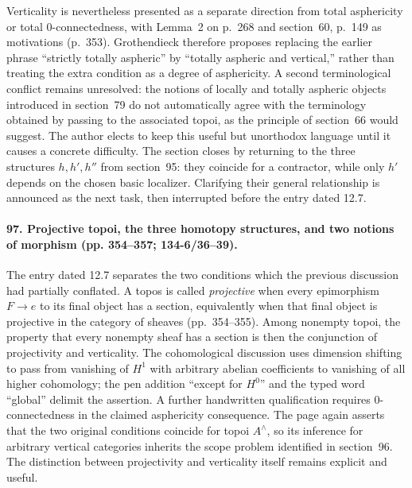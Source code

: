 Verticality is nevertheless presented as a separate direction from total asphericity or total 0-connectedness, with Lemma~2 on p.~268 and section~60, p.~149 as motivations (p.~353). Grothendieck therefore proposes replacing the earlier phrase ``strictly totally aspheric'' by ``totally aspheric and vertical,'' rather than treating the extra condition as a degree of asphericity. A second terminological conflict remains unresolved: the notions of locally and totally aspheric objects introduced in section~79 do not automatically agree with the terminology obtained by passing to the associated topoi, as the principle of section~66 would suggest. The author elects to keep this useful but unorthodox language until it causes a concrete difficulty. The section closes by returning to the three structures $h,h',h''$ from section~95: they coincide for a contractor, while only $h'$ depends on the chosen basic localizer. Clarifying their general relationship is announced as the next task, then interrupted before the entry dated 12.7.


\paragraph{97. Projective topoi, the three homotopy structures, and two notions of morphism (pp. 354--357; 134-6/36--39).}
The entry dated 12.7 separates the two conditions which the previous discussion had partially conflated. A topos is called \emph{projective} when every epimorphism $F\to e$ to its final object has a section, equivalently when that final object is projective in the category of sheaves (pp.~354--355). Among nonempty topoi, the property that every nonempty sheaf has a section is then the conjunction of projectivity and verticality. The cohomological discussion uses dimension shifting to pass from vanishing of $H^1$ with arbitrary abelian coefficients to vanishing of all higher cohomology; the pen addition ``except for $H^0$'' and the typed word ``global'' delimit the assertion. A further handwritten qualification requires 0-connectedness in the claimed asphericity consequence. The page again asserts that the two original conditions coincide for topoi $A^{\wedge}$, so its inference for arbitrary vertical categories inherits the scope problem identified in section~96. The distinction between projectivity and verticality itself remains explicit and useful.

